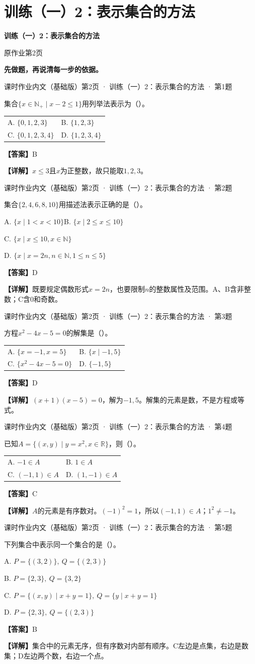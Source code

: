 \documentclass[UTF8,10pt,aspectratio=169]{ctexbeamer}
\makeatletter
\newcommand{\PageHeading}[1]{\begin{center}{\Large\bfseries #1}\end{center}\vspace{0.2cm}}
\newcommand{\Answer}[1]{\par\vspace{0.2cm}\textbf{【答案】}#1}
\newcommand{\Analysis}[1]{\par\vspace{0.2cm}\textbf{【详解】}#1}
\newcommand{\Choices}[4]{\par\vspace{0.2cm}\begin{tabular}{@{}p{0.47\textwidth}p{0.47\textwidth}@{}}A. #1 & B. #2 \\[0.15cm] C. #3 & D. #4\end{tabular}}
\newcommand{\R}{\mathbb R}
\newcommand{\N}{\mathbb N}
\newcommand{\Source}[1]{{\scriptsize\color{gray}#1}\par\vspace{0.25cm}}
\makeatother
\begin{document}
\section{训练（一）2：表示集合的方法}
\begin{frame}
\PageHeading{训练（一）2：表示集合的方法}
原作业第2页\par\vspace{0.4cm}
\textbf{先做题，再说清每一步的依据。}
\end{frame}
\begin{frame}
\Source{课时作业内文（基础版）第2页 · 训练（一）2：表示集合的方法 · 第1题}
集合$\{x\in\N_+\mid x-2\le1\}$用列举法表示为（\quad）。
\Choices{$\{0,1,2,3\}$}{$\{1,2,3\}$}{$\{0,1,2,3,4\}$}{$\{1,2,3,4\}$}
\pause
\Answer{B}
\Analysis{$x\le3$且$x$为正整数，故只能取$1,2,3$。}
\end{frame}
\begin{frame}
\Source{课时作业内文（基础版）第2页 · 训练（一）2：表示集合的方法 · 第2题}
集合$\{2,4,6,8,10\}$用描述法表示正确的是（\quad）。
\par A. $\{x\mid1<x<10\}$\qquad B. $\{x\mid2\le x\le10\}$
\par C. $\{x\mid x\le10,x\in\N\}$
\par D. $\{x\mid x=2n,n\in\N,1\le n\le5\}$
\pause
\Answer{D}
\Analysis{既要规定偶数形式$x=2n$，也要限制$n$的整数属性及范围。A、B含非整数；C含$0$和奇数。}
\end{frame}
\begin{frame}
\Source{课时作业内文（基础版）第2页 · 训练（一）2：表示集合的方法 · 第3题}
方程$x^2-4x-5=0$的解集是（\quad）。
\Choices{$\{x=-1,x=5\}$}{$\{x\mid-1,5\}$}{$\{x^2-4x-5=0\}$}{$\{-1,5\}$}
\pause
\Answer{D}
\Analysis{$(x+1)(x-5)=0$，解为$-1,5$。解集的元素是数，不是方程或等式。}
\end{frame}
\begin{frame}
\Source{课时作业内文（基础版）第2页 · 训练（一）2：表示集合的方法 · 第4题}
已知$A=\{(x,y)\mid y=x^2,x\in\R\}$，则（\quad）。
\Choices{$-1\in A$}{$1\in A$}{$(-1,1)\in A$}{$(1,-1)\in A$}
\pause
\Answer{C}
\Analysis{$A$的元素是有序数对。$(-1)^2=1$，所以$(-1,1)\in A$；$1^2\ne-1$。}
\end{frame}
\begin{frame}
\Source{课时作业内文（基础版）第2页 · 训练（一）2：表示集合的方法 · 第5题}
下列集合中表示同一个集合的是（\quad）。
\par A. $P=\{(3,2)\},\ Q=\{(2,3)\}$
\par B. $P=\{2,3\},\ Q=\{3,2\}$
\par C. $P=\{(x,y)\mid x+y=1\},\ Q=\{y\mid x+y=1\}$
\par D. $P=\{2,3\},\ Q=\{(2,3)\}$
\pause
\Answer{B}
\Analysis{集合中的元素无序，但有序数对内部有顺序。C左边是点集，右边是数集；D左边两个数，右边一个点。}
\end{frame}
\end{document}
